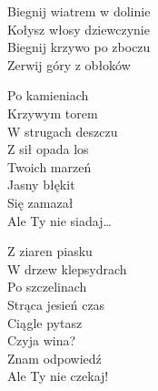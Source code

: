 \begin{text}
    \vin Biegnij wiatrem w dolinie\\
    \vin Kołysz włosy dziewczynie\\
    \vin Biegnij krzywo po zboczu\\
    \vin Zerwij góry z obłoków

    Po kamieniach\\
    Krzywym torem\\
    W strugach deszczu\\
    Z sił opada los\\
    Twoich marzeń\\
    Jasny błękit\\
    Się zamazał\\
    Ale Ty nie siadaj…

    Z ziaren piasku\\
    W drzew klepsydrach\\
    Po szczelinach\\
    Strąca jesień czas\\
    Ciągle pytasz\\
    Czyja wina?\\
    Znam odpowiedź\\
    Ale Ty nie czekaj!
\end{text}
\begin{chord}

\end{chord}